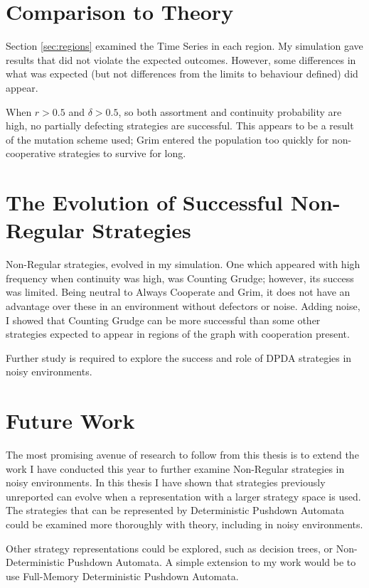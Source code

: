 \documentclass[a4paper,11pt,bcshonoursthesis,singlespace,oneside,thesisdraft,pdflatex]{cssethesis}
\begin{document}
\section{Comparison to Theory}
Section \ref{sec:regions} examined the Time Series in each region. 
My simulation gave results that did not violate the expected outcomes. 
However, some differences in what was expected (but not differences from the limits to behaviour \citep{van-veelen:PNAS:2012} defined) did appear. 

When $r>0.5$ and $\delta>0.5$, so both assortment and continuity probability are high, no partially defecting strategies are successful. 
This appears to be a result of the mutation scheme used; Grim entered the population too quickly for non-cooperative strategies to survive for long.
\section{The Evolution of Successful Non-Regular Strategies}
\label{sec:dpda}
Non-Regular strategies, evolved in my simulation. One which appeared with high frequency when continuity was high, was Counting Grudge; however, its success was limited. 
Being neutral to Always Cooperate and Grim, it does not have an advantage over these in an environment without defectors or noise. 
Adding noise, I showed that Counting Grudge can be more successful than some other strategies expected to appear in regions of the graph with cooperation present. 

Further study is required to explore the success and role of DPDA strategies in noisy environments. 
\section{Future Work}
The most promising avenue of research to follow from this thesis is to extend the work I have conducted this year to further examine Non-Regular strategies in noisy environments. 
In this thesis I have shown that strategies previously unreported can evolve when a representation with a larger strategy space is used. 
The strategies that can be represented by Deterministic Pushdown Automata could be examined more thoroughly with theory, including in noisy environments. 

Other strategy representations could be explored, such as decision trees, or Non-Deterministic Pushdown Automata. 
A simple extension to my work would be to use Full-Memory Deterministic Pushdown Automata.
\appendix %
\end{document}
